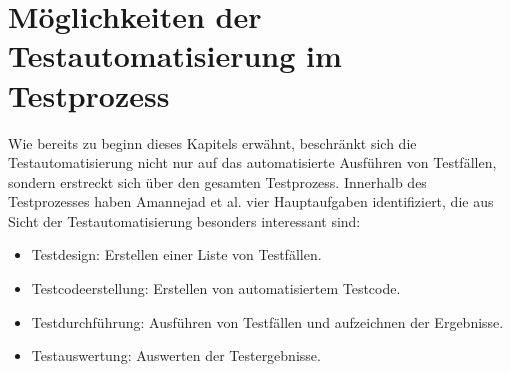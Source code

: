 \section{Möglichkeiten der Testautomatisierung im Testprozess}
\label{sec:bereiche_der_testautomatisierung}
Wie bereits zu beginn dieses Kapitels erwähnt, beschränkt sich die Testautomatisierung nicht nur auf das automatisierte Ausführen von Testfällen, sondern erstreckt sich über den gesamten Testprozess. Innerhalb des Testprozesses haben Amannejad et al. \cite{amannejad_search-based_2014} vier Hauptaufgaben identifiziert, die aus Sicht der Testautomatisierung besonders interessant sind:

\begin{itemize}
\item Testdesign: Erstellen einer Liste von Testfällen.
\item Testcodeerstellung: Erstellen von automatisiertem Testcode.
\item Testdurchführung: Ausführen von Testfällen und aufzeichnen der Ergebnisse.
\item Testauswertung: Auswerten der Testergebnisse.
\end{itemize}

